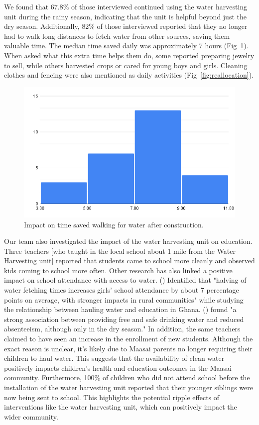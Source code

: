 \documentclass[10pt, twocolumn]{article}
\begin{document}
We found that 67.8\% of those interviewed continued using the water harvesting unit during the rainy season, indicating that the unit is helpful beyond just the dry season. Additionally, 82\% of those interviewed reported that they no longer had to walk long distances to fetch water from other sources, saving them valuable time. The median time saved daily was approximately 7 hours (Fig~\ref{fig:time_saved}). When asked what this extra time helps them do, some reported preparing jewelry to sell, while others harvested crops or cared for young boys and girls. Cleaning clothes and fencing were also mentioned as daily activities (Fig~\ref{fig:reallocation}).

\begin{figure}
    \centering
    \includegraphics[width=1\linewidth]{photos/time_saved.png}
    \caption{Impact on time saved walking for water after construction.}
    \label{fig:time_saved}
\end{figure}

Our team also investigated the impact of the water harvesting unit on education. Three teachers [who taught in the local school about 1 mile from the Water Harvesting unit] reported that students came to school more cleanly and observed kids coming to school more often. Other research has also linked a positive impact on school attendance with access to water. (\autocite{Nauges2017}) Identified that "halving of water fetching times increases girls’ school attendance by about 7 percentage points on average, with stronger impacts in rural communities" while studying the relationship between hauling water and education in Ghana. (\autocite{Cambodia_Water_Education}) found "a strong association between providing free and safe drinking water and reduced absenteeism, although only in the dry season." In addition, the same teachers claimed to have seen an increase in the enrollment of new students. Although the exact reason is unclear, it's likely due to Maasai parents no longer requiring their children to haul water. This suggests that the availability of clean water positively impacts children's health and education outcomes in the Maasai community. Furthermore, 100\% of children who did not attend school before the installation of the water harvesting unit reported that their younger siblings were now being sent to school. This highlights the potential ripple effects of interventions like the water harvesting unit, which can positively impact the wider community. 
\end{document}
